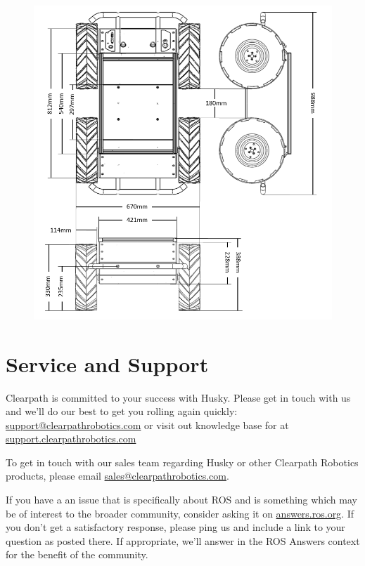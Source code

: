 \documentclass[]{clearpath-latex/clearpath-manual}
\begin{document}
\begin{figure}[h]
	\centering
	\includegraphics[width=\textwidth]{husky-dimensions.png}
\end{figure}
\newpage
\section{Service and Support}
Clearpath is committed to your success with Husky. Please get in touch with us and we'll
do our best to get you rolling again quickly: \href{mailto:support@clearpathrobotics.com}{support@clearpathrobotics.com}
or visit out knowledge base for at \href{http://support.clearpathrobotics.com}{support.clearpathrobotics.com}

To get in touch with our sales team regarding Husky or other Clearpath Robotics products, please
email \href{mailto:sales@clearpathrobotics.com}{sales@clearpathrobotics.com}.

If you have a an issue that is specifically about ROS and is something which may be of interest
to the broader community, consider asking it on \href{http://answers.ros.org}{answers.ros.org}.
If you don't get a satisfactory response, please ping us and include a link to your question
as posted there. If appropriate, we'll answer in the ROS Answers context for the benefit of the
community.
\end{document}
